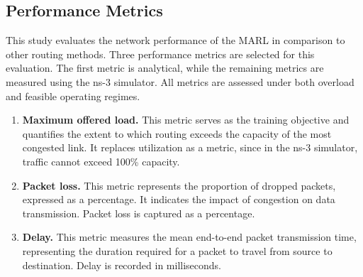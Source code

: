 \subsection{Performance Metrics}
\label{sec:setup-metrics}

This study evaluates the network performance of the MARL in comparison to other routing methods. Three performance metrics are selected for this evaluation. The first metric is analytical, while the remaining metrics are measured using the ns-3 simulator. All metrics are assessed under both overload and feasible operating regimes.
\begin{enumerate}
  \item \textbf{Maximum offered load.} This metric serves as the training objective and quantifies the extent to which routing exceeds the capacity of the most congested link. It replaces utilization as a metric, since in the ns-3 simulator, traffic cannot exceed 100\% capacity.
  \item \textbf{Packet loss.} This metric represents the proportion of dropped packets, expressed as a percentage. It indicates the impact of congestion on data transmission. Packet loss is captured as a percentage.
  \item \textbf{Delay.} This metric measures the mean end-to-end packet transmission time, representing the duration required for a packet to travel from source to destination. Delay is recorded in milliseconds.
\end{enumerate}
